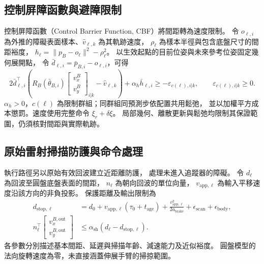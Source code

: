 \subsection{控制屏障函數與避障限制}
\label{subsec:cbf_obstacle_constraints}

控制屏障函數（Control Barrier Function, CBF）將間距轉為速度限制\cite{ames2019cbf}。
令 $o_{\ell,i}$ 為外推的障礙表面樣本、$\hat v_{\ell,k}$ 為其軌跡速度，
$\rho_\ell$ 為樣本半徑與包含底盤尺寸的間距裕度，
$h_\ell=\|p_B-o_\ell\|^2-\rho_\ell^2$。
以生效起點的目前位姿與未來參考位姿固定幾何展開點，
令 $\bar d_{\ell,i}=\bar p_{B,i}-o_{\ell,i}$，可得
\begin{equation}
    2\bar d_{\ell,i}^{\top}
    \left(R_B(\bar\theta_{B,i})
    \begin{bmatrix}v_x^B\\v_y^B\end{bmatrix}_{i|k}
    -\hat v_{\ell,k}\right)
    +\alpha_h\bar h_{\ell,i}
    \geq-\varepsilon_{c(\ell),i|k},
    \qquad \varepsilon_{c(\ell),i|k}\geq0 .
    \label{eq:ch3_cbf_affine_constraint}
\end{equation}
$\alpha_h>0$，$c(\ell)$ 為限制群組；同群組同預測步依配置共用鬆弛，
並以加權平方成本懲罰。速度使用完整命令 $\xi_r+\delta\xi$。
局部幾何、離散更新與鬆弛均限制其保證範圍，仍須核對間距與實際軌跡。

\subsection{原始雷射掃描防護與命令處理}
\label{subsec:raw_scan_command_protection}

執行路徑另以原始有效回波建立近距離防護，
處理未進入追蹤器的障礙。
令 $d_\ell$ 為回波至圓盤底盤表面的間距，
$n_\ell$ 為朝向回波的單位向量，
$v_{\mathrm{app},\ell}$ 為輸入平移速度沿該方向的非負投影。
保護距離及輸出限制為
\begin{equation}
    \begin{aligned}
        d_{\mathrm{stop},\ell}
        &=d_0+v_{\mathrm{app},\ell}(\tau_0+t_{\mathrm{age}})
          +\frac{v_{\mathrm{app},\ell}^2}{2a_{\mathrm{brake}}}
          +\epsilon_{\mathrm{scan}}+\epsilon_{\mathrm{body}},\\
        n_\ell^\top
        \begin{bmatrix}v_x^{B,\mathrm{out}}\\v_y^{B,\mathrm{out}}\end{bmatrix}
        &\leq\alpha_{\mathrm{sh}}(d_\ell-d_{\mathrm{stop},\ell}).
    \end{aligned}
    \label{eq:ch3_scan_stopping_distance}
\end{equation}
各參數分別描述基本間距、延遲與掃描年齡、減速能力及近似裕度。
圓盤模型的法向旋轉速度為零，未直接涵蓋伸展手臂的掃掠範圍。

